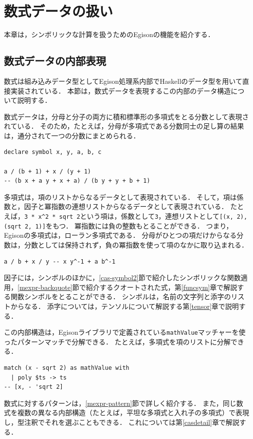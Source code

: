 \chapter{数式データの扱い}\label{mexpr}

本章は，シンボリックな計算を扱うためのEgisonの機能を紹介する．

\section{数式データの内部表現}\label{mexpr-expr}

数式は組み込みデータ型としてEgison処理系内部でHaskellのデータ型を用いて直接実装されている．
本節は，数式データを表現するこの内部のデータ構造について説明する．

数式データは，分母と分子の両方に積和標準形の多項式をとる分数として表現されている．
そのため，たとえば，分母が多項式である分数同士の足し算の結果は，通分されて一つの分数にまとめられる．
\begin{lstlisting}[language=egison,numbers=none]
declare symbol x, y, a, b, c

a / (b + 1) + x / (y + 1)
-- (b x + a y + x + a) / (b y + y + b + 1)
\end{lstlisting}
多項式は，項のリストからなるデータとして表現されている．
そして，項は係数と，因子と冪指数の連想リストからなるデータとして表現されている．
たとえば，\lstinline{3 * x^2 * sqrt 2}という項は，係数として\lstinline{3}，連想リストとして\lstinline{[(x, 2), (sqrt 2, 1)]}をもつ．
冪指数には負の整数もとることができる．
つまり，Egisonの多項式は，ローラン多項式である．
分母がひとつの項だけからなる分数は，分数としては保持されず，負の冪指数を使って項のなかに取り込まれる．
\begin{lstlisting}[language=egison,numbers=none]
a / b + x / y -- x y^-1 + a b^-1
\end{lstlisting}

因子には，シンボルのほかに，\ref{cas-symbol2}節で紹介したシンボリックな関数適用，\ref{mexpr-backquote}節で紹介するクオートされた式，第\ref{funcsym}章で解説する関数シンボルをとることができる．
シンボルは，名前の文字列と添字のリストからなる．
添字については，テンソルについて解説する第\ref{tensor}章で説明する．

この内部構造は，Egisonライブラリで定義されている\lstinline{mathValue}マッチャーを使ったパターンマッチで分解できる．
たとえば，多項式を項のリストに分解できる．
\begin{lstlisting}[language=egison,numbers=none]
match (x - sqrt 2) as mathValue with
  | poly $ts -> ts
-- [x, - 'sqrt 2]
\end{lstlisting}
数式に対するパターンは，\ref{mexpr-pattern}節で詳しく紹介する．
また，同じ数式を複数の異なる内部構造（たとえば，平坦な多項式と入れ子の多項式）で表現し，型注釈でそれを選ぶこともできる．
これについては第\ref{casdetail}章で解説する．

